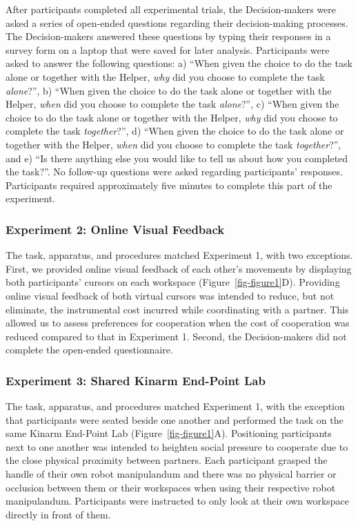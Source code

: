 \documentclass[
  11pt,
  letterpaper,
]{article}
\renewcommand{\emph}[1]{\textit{#1}}  %
\begin{document}
After participants completed all experimental trials, the
Decision-makers were asked a series of open-ended questions regarding
their decision-making processes. The Decision-makers answered these
questions by typing their responses in a survey form on a laptop that
were saved for later analysis. Participants were asked to answer the
following questions: a) ``When given the choice to do the task alone or
together with the Helper, \emph{why} did you choose to complete the task
\emph{alone}?'', b) ``When given the choice to do the task alone or
together with the Helper, \emph{when} did you choose to complete the
task \emph{alone}?'', c) ``When given the choice to do the task alone or
together with the Helper, \emph{why} did you choose to complete the task
\emph{together}?'', d) ``When given the choice to do the task alone or
together with the Helper, \emph{when} did you choose to complete the
task \emph{together}?'', and e) ``Is there anything else you would like
to tell us about how you completed the task?''. No follow-up questions
were asked regarding participants' responses. Participants required
approximately five minutes to complete this part of the experiment.

\subsubsection{Experiment 2: Online Visual
Feedback}\label{experiment-2-online-visual-feedback}

The task, apparatus, and procedures matched Experiment 1, with two
exceptions. First, we provided online visual feedback of each other's
movements by displaying both participants' cursors on each workspace
(Figure~\ref{fig-figure1}D). Providing online visual feedback of both
virtual cursors was intended to reduce, but not eliminate, the
instrumental cost incurred while coordinating with a partner. This
allowed us to assess preferences for cooperation when the cost of
cooperation was reduced compared to that in Experiment 1. Second, the
Decision-makers did not complete the open-ended questionnaire.

\subsubsection{Experiment 3: Shared Kinarm End-Point
Lab}\label{experiment-3-shared-kinarm-end-point-lab}

The task, apparatus, and procedures matched Experiment 1, with the
exception that participants were seated beside one another and performed
the task on the same Kinarm End-Point Lab (Figure~\ref{fig-figure1}A).
Positioning participants next to one another was intended to heighten
social pressure to cooperate due to the close physical proximity between
partners. Each participant grasped the handle of their own robot
manipulandum and there was no physical barrier or occlusion between them
or their workspaces when using their respective robot manipulandum.
Participants were instructed to only look at their own workspace
directly in front of them.
\end{document}
